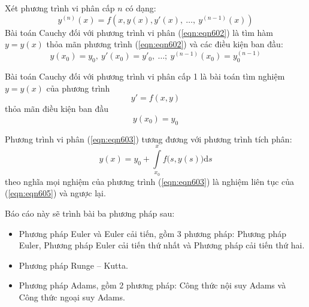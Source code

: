 \begin{definition}
	Xét phương trình vi phân cấp $n$ có dạng:
	\begin{equation}\label{eqn:eqn602}
		y^{(n)}(x)=f\left(x,y(x),y'(x),~\ldots,~y^{(n-1)}(x)\right)
	\end{equation}
	Bài toán Cauchy đối với phương trình vi phân (\ref{eqn:eqn602}) là tìm hàm $y=y(x)$ thỏa mãn phương trình (\ref{eqn:eqn602}) và các điều kiện ban đầu:
	$$y(x_0)=y_0,~y'(x_0)=y'_0,~\ldots;~y^{(n-1)}(x_0)=y^{(n-1)}_0$$

	Bài toán Cauchy đối với phương trình vi phân cấp 1 là bài toán tìm nghiệm $y=y(x)$ của phương trình\\
	\begin{equation}\label{eqn:eqn603}
		y'=f(x,y)
	\end{equation}
	thỏa mãn điều kiện ban đầu
	\begin{equation}\label{eqn:eqn604}
		y(x_0)=y_0
	\end{equation}

	Phương trình vi phân (\ref{eqn:eqn603}) tương đương với phương trình tích phân:
	\begin{equation}\label{eqn:eqn605}
		y(x)= y_0 + \int\limits_{x_0}^{x} f\big(s, y\left(s\right)\big)\mathrm{d}s
	\end{equation}
	theo nghĩa mọi nghiệm của phương trình (\ref{eqn:eqn603}) là nghiệm liên tục của (\ref{eqn:eqn605}) và ngược lại.
\end{definition}
Báo cáo này sẽ trình bài ba phương pháp sau:\par
\begin{itemize}
	\item Phương pháp Euler và Euler cải tiến, gồm 3 phương pháp: Phương pháp Euler, Phương pháp Euler cải tiến thứ nhất và Phương pháp cải tiến thứ hai.
	\item Phương pháp Runge – Kutta.
	\item Phương pháp Adams, gồm 2 phương pháp: Công thức nội suy Adams và Công thức ngoại suy Adams.
\end{itemize}